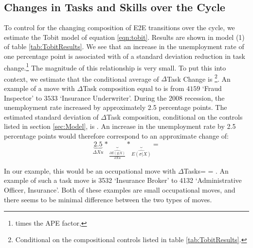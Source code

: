 \documentclass[11pt, oneside]{article}
\begin{document}
\subsection{Changes in Tasks and  Skills over the Cycle}
\label{sec:TobitProbit}


To control for the changing composition of E2E transitions over the cycle, we estimate the Tobit model of equation \ref{eqn:tobit}. Results are shown in model (1) of table \ref{tab:TobitResults}. We see that an increase in the unemployment rate of one percentage point is associated with \hspace{-1mm} of a standard deviation reduction in task change.\footnote{\hspace{-1mm} times the APE factor, \hspace{-1mm}} The magnitude of this relationship is very small. To put this into context, we estimate that the conditional average of $\Delta$Task Change is \hspace{-1mm}\footnote{Conditional on the compositional controls listed in table \ref{tab:TobitResults}.}. An example of a move with $\Delta$Task composition equal to \hspace{-1mm}  is from $4159$ `Fraud Inspector' to $3533$ `Insurance Underwriter'. During the 2008 recession, the unemployment rate increased by approximately 2.5 percentage points. The estimated standard deviation of $\Delta$Task composition, conditional on the controls listed in section \ref{sec:Model}, is \hspace{-1mm}. An increase in the unemployment rate by 2.5 percentage points would therefore correspond to an approximate change of:
\[
\underbrace{2.5}_{\Delta Xu}* \underbrace{}_{\widehat{\frac{\partial E(y| X)}{\partial Xu}}} *\underbrace{}_{ \widehat{E(\sigma|X)}} = 
\]

\noindent In our example, this would be an occupational move with $\Delta$Tasks=\hspace{-1mm}  =  \hspace{-1.5mm}. An example of such a task move is 3532 `Insurance Broker' to 4132 `Administrative Officer, Insurance'. Both of these examples are small occupational moves, and there seems to be minimal difference between the two types of moves.
\end{document}
